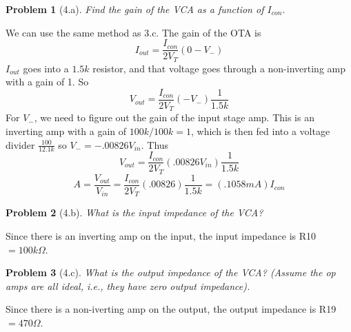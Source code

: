 \documentclass[12pt]{article}
\providecommand{\ohm}[0]{\ensuremath{\Omega}}
\newtheorem*{prob}{Problem}
\begin{document}
\begin{prob}[4.a]{
  Find the gain of the VCA as a function of $I_{con}$.
}\end{prob}
We can use the same method as 3.c. The gain of the OTA is
\[ I_{out} = \frac{I_{con}}{2V_T}(0 - V_-)\]
$I_{out}$ goes into a $1.5k$ resistor, and that voltage goes through a non-inverting amp with a gain of 1. So
\[V_{out} = \frac{I_{con}}{2V_T}(-V_-)\frac{1}{1.5k} \]
For $V_-$, we need to figure out the gain of the input stage amp. This is an inverting amp with a gain of $100k/100k=1$,
which is then fed into a voltage divider $\frac{100}{12.1k}$ so $V_- = -.00826V_{in}$. Thus
\[V_{out} = \frac{I_{con}}{2V_T}(.00826V_{in})\frac{1}{1.5k} \]
\[A = \frac{V_{out}}{V_{in}} = \frac{I_{con}}{2V_T}(.00826)\frac{1}{1.5k} = (.1058mA)I_{con} \]

\begin{prob}[4.b]{
  What is the input impedance of the VCA?
}\end{prob}
Since there is an inverting amp on the input, the input impedance is R10 $=100k\ohm$.

\begin{prob}[4.c]{
  What is the output impedance of the VCA? (Assume the op amps are all ideal, i.e., they have zero output impedance).
}\end{prob}
Since there is a non-iverting amp on the output, the output impedance is R19 $=470\ohm$.
\end{document}
